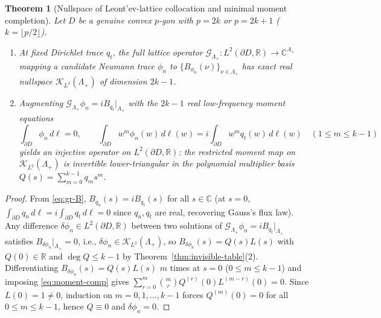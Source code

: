 \documentclass[11pt,reqno]{amsart}
\newtheorem{theorem}{Theorem}[section]
\theoremstyle{definition}
\theoremstyle{remark}
\newcommand{\C}{\mathbb{C}}
\newcommand{\R}{\mathbb{R}}
\begin{document}
\begin{theorem}[Nullspace of Leont'ev-lattice collocation and minimal moment completion]\label{thm:fokas-completion}
Let $D$ be a genuine convex $p$-gon with $p = 2k$ or $p = 2k+1$ ($k = \lfloor p/2 \rfloor$).
\begin{enumerate}
  \item At fixed Dirichlet trace $q_t$, the full lattice operator $\mathcal{G}_{\Lambda_+} : L^2(\partial D, \R) \to \C^{\Lambda_+}$ mapping a candidate Neumann trace $\phi_n$ to $\{B_{\phi_n}(\nu)\}_{\nu \in \Lambda_+}$ has exact real nullspace $\mathcal{K}_{L^2}(\Lambda_+)$ of dimension $2k-1$.
  \item Augmenting $\mathcal{G}_{\Lambda_+} \phi_n = i B_{q_t}|_{\Lambda_+}$ with the $2k-1$ real low-frequency moment equations
  \begin{equation}\label{eq:moment-comp}
    \int_{\partial D} \phi_n\,d\ell = 0, \qquad
    \int_{\partial D} w^m \phi_n(w)\,d\ell(w) = i \int_{\partial D} w^m q_t(w)\,d\ell(w) \quad (1 \le m \le k-1)
  \end{equation}
  yields an injective operator on $L^2(\partial D, \R)$: the restricted moment map on $\mathcal{K}_{L^2}(\Lambda_+)$ is invertible lower-triangular in the polynomial multiplier basis $Q(s) = \sum_{m=0}^{k-1} q_m s^m$.
\end{enumerate}
\end{theorem}

\begin{proof}
From \eqref{eq:gr-B}, $B_{q_n}(s) = i B_{q_t}(s)$ for all $s \in \C$ (at $s = 0$, $\int_{\partial D} q_n\,d\ell = i\int_{\partial D} q_t\,d\ell = 0$ since $q_n, q_t$ are real, recovering Gauss's flux law). Any difference $\delta\phi_n \in L^2(\partial D, \R)$ between two solutions of $\mathcal{G}_{\Lambda_+}\phi_n = i B_{q_t}|_{\Lambda_+}$ satisfies $B_{\delta\phi_n}|_{\Lambda_+} = 0$, i.e., $\delta\phi_n \in \mathcal{K}_{L^2}(\Lambda_+)$, so $B_{\delta\phi_n}(s) = Q(s) L(s)$ with $Q(0) \in \R$ and $\deg Q \le k-1$ by Theorem~\ref{thm:invisible-table}(2). Differentiating $B_{\delta\phi_n}(s) = Q(s)L(s)$ $m$ times at $s = 0$ ($0 \le m \le k-1$) and imposing \eqref{eq:moment-comp} gives $\sum_{r=0}^m \binom{m}{r} Q^{(r)}(0) L^{(m-r)}(0) = 0$. Since $L(0) = 1 \ne 0$, induction on $m = 0, 1, \dots, k-1$ forces $Q^{(m)}(0) = 0$ for all $0 \le m \le k-1$, hence $Q \equiv 0$ and $\delta\phi_n = 0$.
\end{proof}
\end{document}
